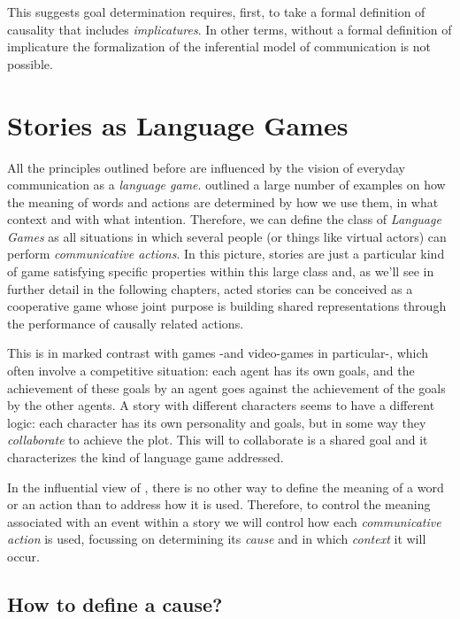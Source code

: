 \documentclass[
		twoside,openright,titlepage,numbers=noenddot,manychapters,
		headinclude,%
                footinclude=false,cleardoublepage=empty,
                BCOR=5mm,
		fontsize=11pt, %
                 enabledeprecatedfontcommands]{scrreprt}
\begin{document}
This suggests goal determination requires, first, to take a formal definition of causality that includes \emph{implicatures}. In other terms, without a formal definition of implicature the formalization of the inferential model of communication is not possible.


\section{Stories as Language Games}

All the principles outlined before are influenced by the vision of everyday communication as a \emph{language game}. \cite{wittgenstein1953pit} outlined a large number of examples on how the meaning of words and actions are determined by how we use them, in what context and with what intention. Therefore, we can define   the class  of \emph{Language Games} as all situations in which several people (or things like virtual actors) can perform \emph{communicative actions}. In this picture, stories are  just a particular kind of game satisfying specific properties within this large class and, as we'll see in further detail in the following chapters, acted stories can be conceived as a cooperative game whose joint purpose is building shared representations through the performance of causally related actions.  

This is in marked contrast with  games -and video-games in particular-, which often involve a competitive situation: each agent has its own goals, and the achievement of these goals by an agent goes against the achievement of the goals by the other agents. A story with different characters seems to have a different logic: each character has its own personality and goals, but in some way they \emph{collaborate} to achieve the plot. This will to collaborate is a shared goal and it characterizes the kind of language game addressed.

In the influential view of \cite{wittgenstein1953pit}, there is no other way to define the meaning of a word or an action than to address how it is used. Therefore, to control the meaning associated with an event within a story we will control how each \emph{communicative action} is used, focussing on determining its \emph{cause} and in which \emph{context} it will occur.


\subsection{How to define a cause?}
\end{document}
